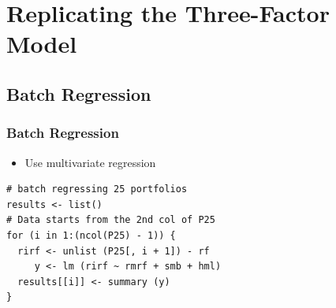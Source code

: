 \documentclass{beamer}
\begin{document}

\begin{frame}

\end{frame}



\section{Replicating the Three-Factor Model}
%


\label{current spot}


\begin{frame}

\end{frame}


\subsection{Batch Regression}
\begin{frame}[fragile]
\frametitle{Batch Regression}
\begin{itemize}
\item Use multivariate regression
\end{itemize}
\begin{lstlisting}
# batch regressing 25 portfolios 
results <- list()
# Data starts from the 2nd col of P25
for (i in 1:(ncol(P25) - 1)) { 
  rirf <- unlist (P25[, i + 1]) - rf   
     y <- lm (rirf ~ rmrf + smb + hml)
  results[[i]] <- summary (y)
}
\end{lstlisting}
\end{frame}
\end{document}
